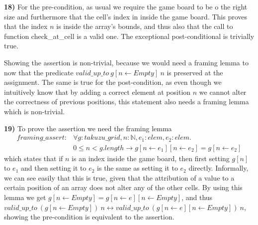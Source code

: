 \documentclass[]{StandardTemplate}
\begin{document}
\textbf{18)} For the pre-condition, as usual we require the game board to be o the right size and furthermore that the cell's index in inside the game board. This proves that the index $ n $ is inside the array's bounds, and thus also that the call to function check\_at\_cell is a valid one. The exceptional post-conditional is trivially true.

Showing the assertion is non-trivial, because we would need a framing lemma to now that the predicate $ valid\_up\_to~g[n\leftarrow  Empty]~n $ is preserved at the assignment. The same is true for the post-condition, as even though we intuitively know that by adding a correct element at position $ n $ we cannot alter the correctness of previous positions, this statement also needs a framing lemma which is non-trivial.

\textbf{19)} To prove the assertion we need the framing lemma 
\begin{align*}
framing\_assert :&\forall g : takuzu\_grid, n : \mathbb{N}, e_1 : elem, e_2 :elem.\\ &0 \leq n < g.length\to g[n\leftarrow e_1][n\leftarrow e_2] = g[n\leftarrow e_2]
\end{align*}
which states that if $ n $ is an index inside the game board, then first setting $ g[n] $ to $ e_1 $ and then setting it to $ e_2 $ is the same as setting it to $ e_2 $ directly. Informally, we can see easily that this is true, given that the attribution of a value to a certain position of an array does not alter any of the other cells. By using this lemma we get $ g[n \leftarrow Empty] = g[n \leftarrow e][n \leftarrow Empty] $, and thus $ valid\_up\_to~(g[n\leftarrow Empty])~n \leftrightarrow  valid\_up\_to~(g[n \leftarrow e][n \leftarrow Empty])~n$, showing the pre-condition is equivalent to the assertion.
\end{document}
